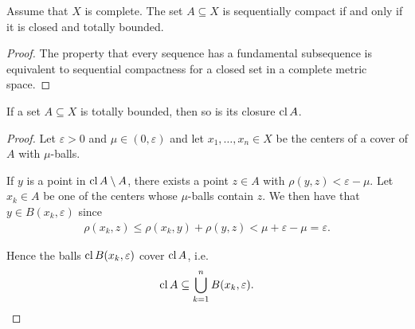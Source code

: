 \begin{corollary}\label{thm:metric_space_compact_iff_closed_totally_bounded}
  Assume that $X$ is complete. The set $A \subseteq X$ is sequentially compact if and only if it is closed and totally bounded.
\end{corollary}
\begin{proof}
  The property that every sequence has a fundamental subsequence is equivalent to sequential compactness for a closed set in a complete metric space.
\end{proof}

\begin{proposition}\label{thm:closure_of_totally_bounded_is_totally_bounded}
  If a set $A \subseteq X$ is totally bounded, then so is its closure $\operatorname{cl} A$.
\end{proposition}
\begin{proof}
  Let $\varepsilon > 0$ and $\mu \in (0, \varepsilon)$ and let $x_1, \ldots, x_n \in X$ be the centers of a cover of $A$ with $\mu$-balls.

  If $y$ is a point in $\operatorname{cl} A \setminus A$, there exists a point $z \in A$ with $\rho(y, z) < \varepsilon - \mu$. Let $x_k \in A$ be one of the centers whose $\mu$-balls contain $z$. We then have that $y \in B(x_k, \varepsilon)$ since
  \begin{align*}
    \rho(x_k, z) \leq \rho(x_k, y) + \rho(y, z) < \mu + \varepsilon - \mu = \varepsilon.
  \end{align*}

  Hence the balls $\operatorname{cl} B(x_k, \varepsilon)$ cover $\operatorname{cl} A$, i.e.
  \begin{align*}
    \operatorname{cl} A \subseteq \bigcup_{k=1}^n B(x_k, \varepsilon).
  \end{align*}
\end{proof}

